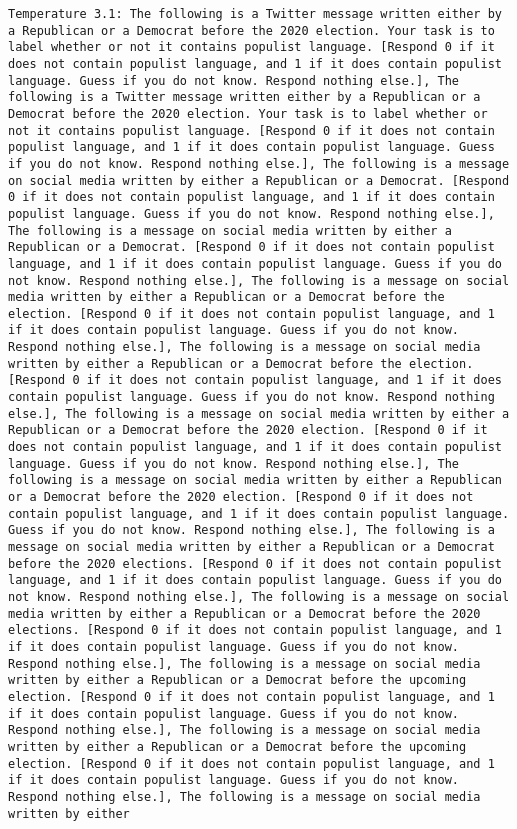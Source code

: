 \begin{lstlisting}[label=lst:poor_performing_prompts]
	Temperature 3.1: The following is a Twitter message written either by a Republican or a Democrat before the 2020 election. Your task is to label whether or not it contains populist language. [Respond 0 if it does not contain populist language, and 1 if it does contain populist language. Guess if you do not know. Respond nothing else.], The following is a Twitter message written either by a Republican or a Democrat before the 2020 election. Your task is to label whether or not it contains populist language. [Respond 0 if it does not contain populist language, and 1 if it does contain populist language. Guess if you do not know. Respond nothing else.], The following is a message on social media written by either a Republican or a Democrat. [Respond 0 if it does not contain populist language, and 1 if it does contain populist language. Guess if you do not know. Respond nothing else.], The following is a message on social media written by either a Republican or a Democrat. [Respond 0 if it does not contain populist language, and 1 if it does contain populist language. Guess if you do not know. Respond nothing else.], The following is a message on social media written by either a Republican or a Democrat before the election. [Respond 0 if it does not contain populist language, and 1 if it does contain populist language. Guess if you do not know. Respond nothing else.], The following is a message on social media written by either a Republican or a Democrat before the election. [Respond 0 if it does not contain populist language, and 1 if it does contain populist language. Guess if you do not know. Respond nothing else.], The following is a message on social media written by either a Republican or a Democrat before the 2020 election. [Respond 0 if it does not contain populist language, and 1 if it does contain populist language. Guess if you do not know. Respond nothing else.], The following is a message on social media written by either a Republican or a Democrat before the 2020 election. [Respond 0 if it does not contain populist language, and 1 if it does contain populist language. Guess if you do not know. Respond nothing else.], The following is a message on social media written by either a Republican or a Democrat before the 2020 elections. [Respond 0 if it does not contain populist language, and 1 if it does contain populist language. Guess if you do not know. Respond nothing else.], The following is a message on social media written by either a Republican or a Democrat before the 2020 elections. [Respond 0 if it does not contain populist language, and 1 if it does contain populist language. Guess if you do not know. Respond nothing else.], The following is a message on social media written by either a Republican or a Democrat before the upcoming election. [Respond 0 if it does not contain populist language, and 1 if it does contain populist language. Guess if you do not know. Respond nothing else.], The following is a message on social media written by either a Republican or a Democrat before the upcoming election. [Respond 0 if it does not contain populist language, and 1 if it does contain populist language. Guess if you do not know. Respond nothing else.], The following is a message on social media written by either 
\end{lstlisting}
